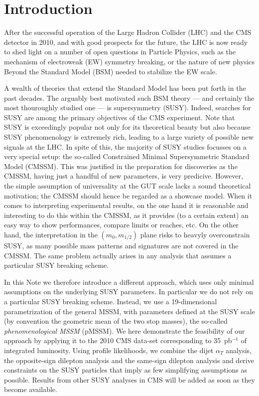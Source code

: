 \section{Introduction}
\label{sec:intro}

After the successful operation of the Large Hadron Collider (LHC) and the CMS detector
in 2010, and with good prospects for the future, the LHC is now ready to shed light on a number 
of open questions in Particle Physics, 
such as the mechanism of electroweak (EW) symmetry breaking, or the nature 
of new physics Beyond the Standard Model (BSM) needed to stabilize the EW scale. 

A wealth of theories that extend the Standard Model has been put forth in the past decades. 
The arguably best motivated such BSM theory --- and certainly the most 
thouroughly studied one --- is supersymmetry (SUSY). 
Indeed, searches for SUSY are among the primary objectives of the 
CMS experiment. Note that SUSY is exceedingly popular not 
only for its theoretical beauty but also because SUSY phenomenology 
is extremely rich, 
leading to a large variety of possible new signals at the LHC. 
In spite of this, the majority of SUSY studies focusses on a very special 
setup: the so-called Constrained Minimal Supersymmetric Standard Model (CMSSM). 
This was justified in the preparation for discoveries as the CMSSM, 
having just a handful of new parameters, is very predicive. However, 
the simple assumption of universality at the GUT scale lacks a sound 
theoretical motivation; the CMSSM should hence be regarded as a showcase 
model. When it comes to interpreting experimental results, on the 
one hand it is reasonable and interesting to do this within the CMSSM, 
as it provides (to a certain extent) an easy way to show performances, 
compare limits or reaches, etc. On the other hand, the interpretation in the 
$(m_0,m_{1/2})$ plane risks to heavyly overconstrain SUSY, as many 
possible mass patterns and signatures are not covered in the CMSSM. 
The same problem actually arises in any analysis that assumes a particular 
SUSY breaking scheme. 

In this Note we therefore introduce a different approach, which uses only 
minimal assumptions on the underlying SUSY parameters. In particular we do 
not rely on a particular SUSY breaking scheme. Instead, we use a 19-dimensional 
parametrization of the general MSSM, with parameters defined at the SUSY scale 
(by convention the geometric mean of the two stop masses), 
the so-called \emph{phenomenological MSSM} (pMSSM). 
We here demonstrate the feasibility of our approach by applying it to 
the 2010 CMS data-set corresponding to 35~pb$^{-1}$ of integrated luminosity.  
Using profile likelihoods, we combine 
the dijet $\alpha_T$ analysis, the opposite-sign dilepton 
analysis and the same-sign dilepton analysis and derive constraints 
on the SUSY particles that imply as few simplifying assumptions as possible.
Results from other SUSY analyses in CMS will be added as soon as they become available.

